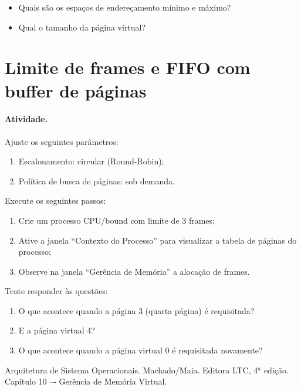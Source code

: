 \documentclass[11pt,a4paper]{article}
\begin{document}
\begin{itemize}
\item Quais são os espaços de endereçamento mínimo e máximo?
\item Qual o tamanho da página virtual?
\end{itemize}

\section{Limite de frames e FIFO com buffer de páginas}

\paragraph{Atividade.} 

Ajuste os seguintes parâmetros:
\begin{enumerate}
\item Escalonamento: circular (Round-Robin);
\item Política de busca de páginas: sob demanda.
\end{enumerate}

Execute os seguintes passos:

\begin{enumerate}
\item Crie um processo CPU/bound com limite de 3 frames;
\item Ative a janela ``Contexto do Processo'' para visualizar a tabela
  de páginas do processo;
\item Observe na janela ``Gerência de Memória'' a alocação de frames.
\end{enumerate}

Tente responder às questões:
\begin{enumerate}
\item O que acontece quando a página 3 (quarta página) é requisitada?
\item E a página virtual 4?
\item O que acontece quando a página virtual 0 é requisitada novamente?
\end{enumerate}


\begin{thebibliography}{5}
  
 Arquitetura de Sistema
  Operacionais. Machado/Maia. Editora LTC, 4$^a$ edição. Capítulo 10
  –- Gerência de Memória Virtual.
\end{thebibliography}
\end{document}
